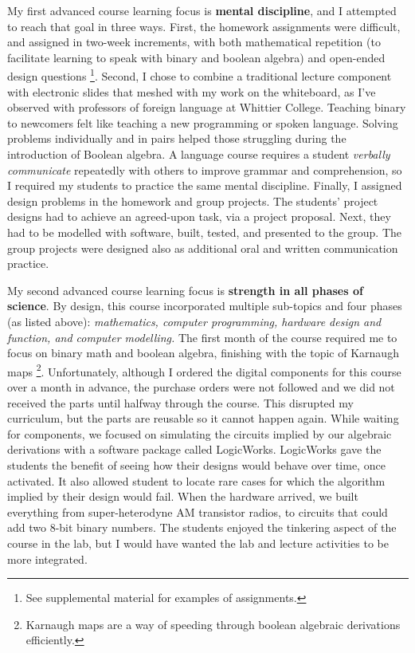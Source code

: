 \documentclass[../../../main.tex]{subfiles}
\begin{document}
My first advanced course learning focus is \textbf{mental discipline}, and I attempted to reach that goal in three ways.  First, the homework assignments were difficult, and assigned in two-week increments, with both mathematical repetition (to facilitate learning to speak with binary and boolean algebra) and open-ended design questions \footnote{See supplemental material for examples of assignments.}.  Second, I chose to combine a traditional lecture component with electronic slides that meshed with my work on the whiteboard, as I've observed with professors of foreign language at Whittier College.  Teaching binary to newcomers felt like teaching a new programming or spoken language.  Solving problems individually and in pairs helped those struggling during the introduction of Boolean algebra.  A language course requires a student \textit{verbally communicate} repeatedly with others to improve grammar and comprehension, so I required my students to practice the same mental discipline.  Finally, I assigned design problems in the homework and group projects.  The students' project designs had to achieve an agreed-upon task, via a project proposal.  Next, they had to be modelled with software, built, tested, and presented to the group.  The group projects were designed also as additional oral and written communication practice. \\ \hspace{0.1cm}

My second advanced course learning focus is \textbf{strength in all phases of science}.  By design, this course incorporated multiple sub-topics and four phases (as listed above): \textit{mathematics, computer programming, hardware design and function, and computer modelling.}  The first month of the course required me to focus on binary math and boolean algebra, finishing with the topic of Karnaugh maps \footnote{Karnaugh maps are a way of speeding through boolean algebraic derivations efficiently.}.  Unfortunately, although I ordered the digital components for this course over a month in advance, the purchase orders were not followed and we did not received the parts until halfway through the course.  This disrupted my curriculum, but the parts are reusable so it cannot happen again.  While waiting for components, we focused on simulating the circuits implied by our algebraic derivations with a software package called LogicWorks.  LogicWorks gave the students the benefit of seeing how their designs would behave over time, once activated.  It also allowed student to locate rare cases for which the algorithm implied by their design would fail.  When the hardware arrived, we built everything from super-heterodyne AM transistor radios, to circuits that could add two 8-bit binary numbers.  The students enjoyed the tinkering aspect of the course in the lab, but I would have wanted the lab and lecture activities to be more integrated. \\ \hspace{0.1cm}
\end{document}

